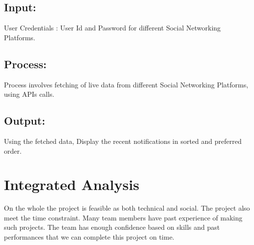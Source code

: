 \documentclass[12pt]{article}
\begin{document}
	\subsection{Input:} 
	User Credentials : User Id and Password for different Social Networking Platforms.
	\subsection{Process:} Process involves fetching of live data from different Social Networking Platforms, using APIs calls. 
	\subsection{Output:} 
	Using the fetched data, Display the recent notifications in sorted and preferred order.
	
    \section{Integrated Analysis}
    On the whole the project is feasible as both technical and social. The project
also meet the time constraint. Many team members have past experience of
making such projects. The team has enough confidence based on skills and past
performances that we can complete this project on time.
	\newpage
	
	
\end{document}
